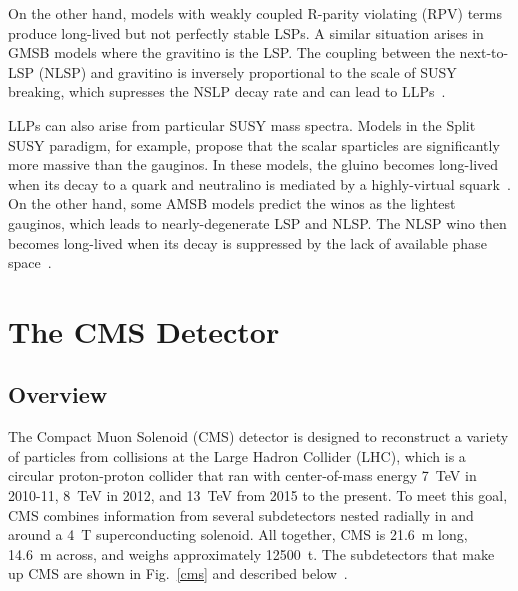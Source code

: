 \documentclass[12pt]{article}
\begin{document}
    On the other hand, models with weakly coupled R-parity violating (RPV) terms produce long-lived but not perfectly stable LSPs. A similar situation arises in GMSB models where the gravitino is the LSP. The coupling between the next-to-LSP (NLSP) and gravitino is inversely proportional to the scale of SUSY breaking, which supresses the NSLP decay rate and can lead to LLPs~\cite{dimopoulos_low_energy}.


    LLPs can also arise from particular SUSY mass spectra. Models in the Split SUSY paradigm, for example, propose that the scalar sparticles are significantly more massive than the gauginos. In these models, the gluino becomes long-lived when its decay to a quark and neutralino is mediated by a highly-virtual squark~\cite{kilian_split}.  On the other hand, some AMSB models predict the winos as the lightest gauginos, which leads to nearly-degenerate LSP and NLSP. The NLSP wino then becomes long-lived when its decay is suppressed by the lack of available phase space~\cite{randall_sundrum_out_of_this_world}.


\section{The CMS Detector}
    \subsection{Overview}
        The Compact Muon Solenoid (CMS) detector is designed to reconstruct a variety of particles from collisions at the Large Hadron Collider (LHC), which is a circular proton-proton collider that ran with center-of-mass energy \SI{7}{\tera\electronvolt} in 2010-11, \SI{8}{\tera\electronvolt} in 2012, and \SI{13}{\tera\electronvolt} from 2015 to the present. To meet this goal, CMS combines information from several subdetectors nested radially in and around a \SI{4}{\tesla} superconducting solenoid. All together, CMS is \SI{21.6}{\m} long, \SI{14.6}{\m} across, and weighs approximately \SI{12500}{t}. The subdetectors that make up CMS are shown in Fig.~\ref{cms} and described below~\cite{cms_experiment}.
\end{document}
